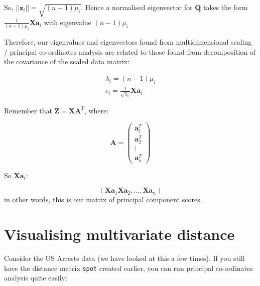 So, $||\boldsymbol{z}_{i}|| = \sqrt{(n-1) \mu_{i}}$.   Hence a normalised eigenvector for $\boldsymbol{Q}$ takes the form $\frac{1}{(n-1)\mu_{i}} \boldsymbol{Xa}_{i}$ with eigenvalue $(n-1) \mu_{i}$


Therefore, our eigenvalues and eigenvectors found from multidimensional scaling / principal co-ordinates analysis are related to those found from decomposition of the covariance of the scaled data matrix:

\begin{eqnarray*}
\lambda_{i} = (n-1) \mu_{i}\\
e_{i} = \frac{1}{\sqrt{\lambda_{i}}} \boldsymbol{Xa}_{i}
\end{eqnarray*}

Remember that $\boldsymbol{Z} = \boldsymbol{XA}^{T}$, where:

\begin{displaymath}
\boldsymbol{A} = \left( \begin{array}{c} \boldsymbol{a}_{1}^{T} \\  \boldsymbol{a}_{2}^{T} \\ \vdots \\ \boldsymbol{a}_{n}^{T}   \end{array} \right)
\end{displaymath}

So $\boldsymbol{Xa}_{i}$:

\begin{displaymath}
 \left( \boldsymbol{Xa}_{1} \boldsymbol{Xa}_{2}, \ldots, \boldsymbol{Xa}_{n} \right)
\end{displaymath}
in other words, this is our matrix of principal component scores.





\section{Visualising multivariate distance}
\label{visdist}

Consider the US Arrests data (we have looked at this a few times).   If you still have the distance matrix \texttt{spot} created earlier, you can run principal co-ordinates analysis quite easily:

